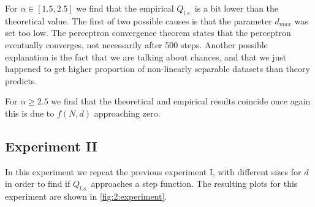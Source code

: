 For $\alpha \in [1.5, 2.5]$ we find that the empirical $Q_{l.s.}$ is a bit lower than the theoretical value. The first of two possible causes is that the parameter $d_{max}$ was set too low. The perceptron convergence theorem states that the perceptron eventually converges, not necessarily after 500 steps. Another possible explanation is the fact that we are talking about chances, and that we just happened to get higher proportion of non-linearly separable datasets than theory predicts. 

For $\alpha \geq 2.5$ we find that the theoretical and empirical results coincide once again this is due to $f(N,d)$ approaching zero.

\subsection*{Experiment II}

In this experiment we repeat the previous experiment I, with different sizes for $d$ in order to find if $Q_{l.s.}$ approaches a step function. The resulting plots for this experiment are shown in \vref{fig:2:experiment}. 

